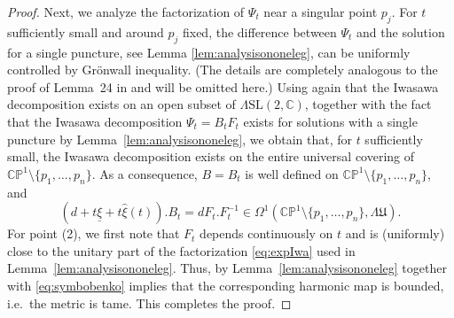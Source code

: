 \documentclass[12pt,a4paper]{amsart}
\theoremstyle{definition}
\theoremstyle{remark}
\newcommand{\C}{\mathbb C}
\newcommand{\CP}{\mathbb{CP}}
\begin{document}
\begin{proof}
Next, we analyze the factorization of $\Psi_t$ near a singular point $p_j$.
For $t$ sufficiently small and around $p_j$ fixed, the difference between $\Psi_t$ and the solution for a single puncture, see Lemma \ref{lem:analysisononeleg}, can be uniformly controlled by Gr\"onwall inequality.
(The details are completely analogous to the proof of Lemma~24 in \cite{CHHT} and will
be omitted here.)
Using again that the Iwasawa decomposition exists on an open subset of
$\Lambda\mathrm{SL}(2,\C)$, together with the fact that the Iwasawa decomposition
$\Psi_t=B_tF_t$ exists for solutions with a single puncture by Lemma~\ref{lem:analysisononeleg},
we obtain that, for $t$ sufficiently small, the Iwasawa decomposition exists on the
entire universal covering of $\CP^1\setminus\{p_1,\dots,p_n\}$.
As a consequence, $B=B_t$ is well defined on
$\CP^1\setminus\{p_1,\dots,p_n\}$, and
\[
(d+t\underline\xi+t\hat\xi(t)). B_t
=
dF_t. F_t^{-1}
\in
\Omega^1(\CP^1\setminus\{p_1,\dots,p_n\},\Lambda\mathfrak U).
\]
For point (2), we first note that $F_t$ depends continuously on $t$ and is
(uniformly) close to the unitary part of the factorization \eqref{eq:expIwa} used in Lemma~\ref{lem:analysisononeleg}. Thus, by Lemma~\ref{lem:analysisononeleg} together
with \eqref{eq:symbobenko} implies that the corresponding harmonic map is bounded,
i.e.\ the metric is tame.
This completes the proof.
\end{proof}


\end{document}
